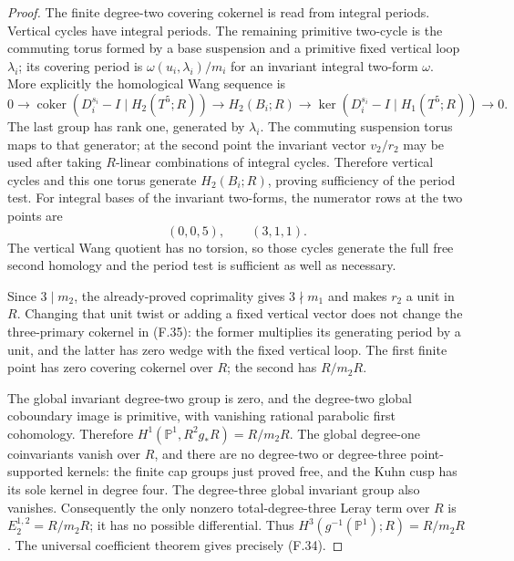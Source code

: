 \begin{proof}
The finite degree-two covering cokernel is read from
integral periods.  Vertical cycles have integral periods.
The remaining primitive two-cycle is the commuting torus
formed by a base suspension and a primitive fixed vertical
loop $\lambda_i$; its covering period is
$\omega(u_i,\lambda_i)/m_i$ for an invariant integral
two-form $\omega$.
More explicitly the homological Wang sequence is
\[
 0\longrightarrow\operatorname{coker}(D_i^{s_i}-I\mid H_2(T^5;R))
 \longrightarrow H_2(B_i;R)
 \longrightarrow\ker(D_i^{s_i}-I\mid H_1(T^5;R))
 \longrightarrow0.
\]
The last group has rank one, generated by $\lambda_i$.
The commuting suspension torus maps to that generator;
at the second point the invariant vector $v_2/r_2$ may be used after taking
$R$-linear combinations of integral cycles.
Therefore vertical cycles and this one torus generate
$H_2(B_i;R)$, proving sufficiency of the period test.
For integral bases of the invariant two-forms, the numerator
rows at the two points are
\[
 (0,0,5),\qquad (3,1,1).
 \tag{F.35}
\]
The vertical Wang quotient has no torsion, so those cycles
generate the full free second homology and the period test
is sufficient as well as necessary.

Since $3\mid m_2$, the already-proved coprimality gives
$3\nmid m_1$ and makes $r_2$ a unit in $R$.
Changing that unit twist or adding a fixed vertical vector
does not change the three-primary cokernel in (F.35): the
former multiplies its generating period by a unit, and the
latter has zero wedge with the fixed vertical loop.
The first finite point has zero covering cokernel over $R$;
the second has $R/m_2R$.

The global invariant degree-two group is zero, and the
degree-two global coboundary image is primitive, with
vanishing rational parabolic first cohomology.  Therefore
$H^1(\mathbb P^1,R^2g_*R)=R/m_2R$.
The global degree-one coinvariants vanish over $R$, and
there are no degree-two or degree-three point-supported
kernels: the finite cap groups just proved free, and the
Kuhn cusp has its sole kernel in degree four.
The degree-three global invariant group also vanishes.
Consequently the only nonzero total-degree-three Leray
term over $R$ is $E_2^{1,2}=R/m_2R$; it has no possible
differential.  Thus $H^3(g^{-1}(\mathbb P^1);R)=R/m_2R$.
The universal coefficient theorem gives precisely (F.34).
\end{proof}
